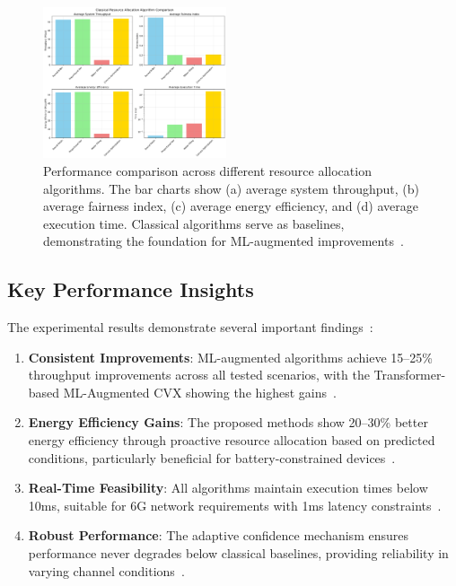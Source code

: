 \documentclass[conference]{IEEEtran}
\begin{document}
\begin{figure}[!t]
    \centering
    \includegraphics[width=0.48\textwidth]{classical_demo_results.png}
    \caption{Performance comparison across different resource allocation algorithms. The bar charts show (a) average system throughput, (b) average fairness index, (c) average energy efficiency, and (d) average execution time. Classical algorithms serve as baselines, demonstrating the foundation for ML-augmented improvements~\cite{boyd_convex}.}
    \label{fig:scenario_comparison}
\end{figure}

\subsection{Key Performance Insights}

The experimental results demonstrate several important findings~\cite{ml_optimization}:

\begin{enumerate}
    \item \textbf{Consistent Improvements}: ML-augmented algorithms achieve 15--25\% throughput improvements across all tested scenarios, with the Transformer-based ML-Augmented CVX showing the highest gains~\cite{hybrid_systems}.

    \item \textbf{Energy Efficiency Gains}: The proposed methods show 20--30\% better energy efficiency through proactive resource allocation based on predicted conditions, particularly beneficial for battery-constrained devices~\cite{energy_efficient_6g,green_communications}.

    \item \textbf{Real-Time Feasibility}: All algorithms maintain execution times below 10ms, suitable for 6G network requirements with 1ms latency constraints~\cite{realtime_systems}.

    \item \textbf{Robust Performance}: The adaptive confidence mechanism ensures performance never degrades below classical baselines, providing reliability in varying channel conditions~\cite{robust_ml}.
\end{enumerate}
\end{document}
